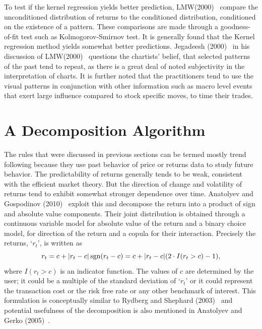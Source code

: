 To test if the kernel regression yields better prediction, LMW(2000)~\cite{LoMWang} compare the unconditioned distribution of returns to the conditioned distribution, conditioned on the existence of a pattern. These comparisons are made through a goodness-of-fit test such as Kolmogorov-Smirnov test. It  is generally found that the Kernel regression method yields somewhat better predictions. Jegadeesh (2000)~\cite{Jeqa} in his discussion of LMW(2000)~\cite{LoMWang} questions the chartists' belief, that selected patterns of the past tend to repeat, as there is a great deal of noted subjectivity in the interpretation of charts. It is further noted that the practitioners tend to use the visual patterns in conjunction with other information such as macro level events that exert large influence compared to stock specific moves, to time their trades.



\section{A Decomposition Algorithm \label{s:decomp_alg}} \label{in:decomp1}

The rules that were discussed in previous sections can be termed mostly trend following because they use past behavior of price or returns data to study future behavior. The predictability of returns generally tends to be weak, consistent with the efficient market theory. But the direction of change and volatility of returns tend to exhibit somewhat stronger dependence over time. Anatolyev and Gospodinov (2010)~\cite{Ananto2} exploit this and decompose the return into a product of sign and absolute value components. Their joint distribution is obtained through a continuous variable model for absolute value of the return and a binary choice model, for direction of the return and a copula for their interaction. Precisely the returns, `$r_{t}$', is written as
	\begin{equation} \label{eqn:3sgn}
	r_t = c + \lvert r_t - c\rvert \sgn (r_t - c)= c + \lvert r_t - c \rvert (2\cdot I(r_t  > c) - 1),
	\end{equation}
where $I(r_t > c)$ is an indicator function. The values of $c$ are determined by the user; it could be a multiple of the standard deviation of `$r_{t}$' or it could represent the transaction cost or the risk free rate or any other benchmark of interest. This formulation is conceptually similar to Rydberg and Shephard (2003)~\cite{Ryd} and potential usefulness of the decomposition is also mentioned in Anatolyev and Gerko (2005)~\cite{Ananto1}.


